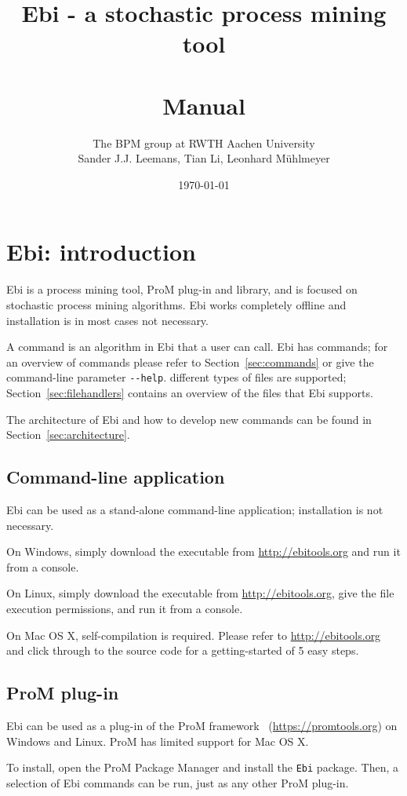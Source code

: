 \documentclass{article}
\title{Ebi - a stochastic process mining tool\\{\small\version}\\Manual}
\author{The BPM group at RWTH Aachen University\\
Sander J.J. Leemans, Tian Li, Leonhard Mühlmeyer}
\date{\today}
\begin{document}
\maketitle

\tableofcontents

\clearpage
\section{Ebi: introduction}
	Ebi is a process mining tool, ProM plug-in and library, and is focused on stochastic process mining algorithms.
	Ebi works completely offline and installation is in most cases not necessary.
		
	A command is an algorithm in Ebi that a user can call.
	Ebi has \numberofcommands{} commands; for an overview of commands please refer to Section~\ref{sec:commands} or give the command-line parameter \verb=--help=.
	\numberoffilehandlers{} different types of files are supported; Section~\ref{sec:filehandlers} contains an overview of the files that Ebi supports.
	
	The architecture of Ebi and how to develop new commands can be found in Section~\ref{sec:architecture}.
	
	\subsection{Command-line application}
		Ebi can be used as a stand-alone command-line application; installation is not necessary.
		
		On Windows, simply download the executable from \url{http://ebitools.org} and run it from a console.
		
		On Linux, simply download the executable from \url{http://ebitools.org}, give the file execution permissions, and run it from a console.
		
		On Mac OS X, self-compilation is required. 
		Please refer to \url{http://ebitools.org} and click through to the source code for a getting-started of 5 easy steps.
		
	\subsection{ProM plug-in}
		Ebi can be used as a plug-in of the ProM framework~\cite{DBLP:conf/bpm/VerbeekBDA10} (\url{https://promtools.org}) on Windows and Linux. 
		ProM has limited support for Mac OS X.
		
		To install, open the ProM Package Manager and install the \verb=Ebi= package.
		Then, a selection of Ebi commands can be run, just as any other ProM plug-in.
		
\end{document}
